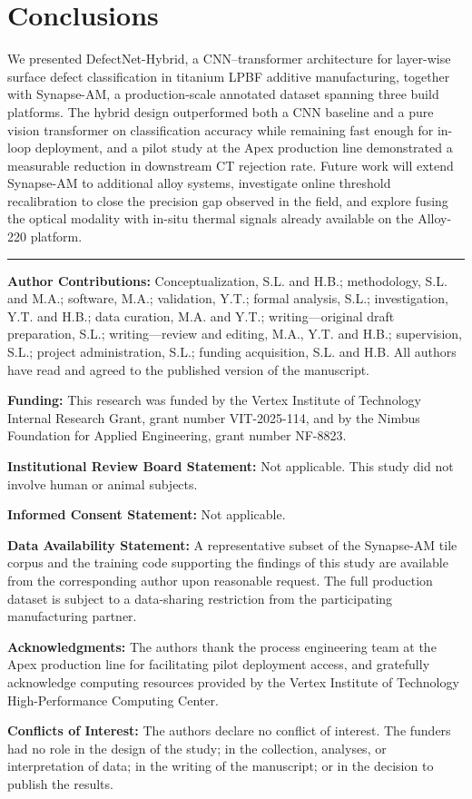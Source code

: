 \section{Conclusions}
We presented DefectNet-Hybrid, a CNN--transformer architecture for layer-wise surface defect classification in titanium LPBF additive manufacturing, together with Synapse-AM, a production-scale annotated dataset spanning three build platforms. The hybrid design outperformed both a CNN baseline and a pure vision transformer on classification accuracy while remaining fast enough for in-loop deployment, and a pilot study at the Apex production line demonstrated a measurable reduction in downstream CT rejection rate. Future work will extend Synapse-AM to additional alloy systems, investigate online threshold recalibration to close the precision gap observed in the field, and explore fusing the optical modality with in-situ thermal signals already available on the Alloy-220 platform.

\vspace{4pt}
\noindent\rule{\linewidth}{0.4pt}

{\small
\noindent\textbf{Author Contributions:} Conceptualization, S.L. and H.B.; methodology, S.L. and M.A.; software, M.A.; validation, Y.T.; formal analysis, S.L.; investigation, Y.T. and H.B.; data curation, M.A. and Y.T.; writing---original draft preparation, S.L.; writing---review and editing, M.A., Y.T. and H.B.; supervision, S.L.; project administration, S.L.; funding acquisition, S.L. and H.B. All authors have read and agreed to the published version of the manuscript.

\noindent\textbf{Funding:} This research was funded by the Vertex Institute of Technology Internal Research Grant, grant number VIT-2025-114, and by the Nimbus Foundation for Applied Engineering, grant number NF-8823.

\noindent\textbf{Institutional Review Board Statement:} Not applicable. This study did not involve human or animal subjects.

\noindent\textbf{Informed Consent Statement:} Not applicable.

\noindent\textbf{Data Availability Statement:} A representative subset of the Synapse-AM tile corpus and the training code supporting the findings of this study are available from the corresponding author upon reasonable request. The full production dataset is subject to a data-sharing restriction from the participating manufacturing partner.

\noindent\textbf{Acknowledgments:} The authors thank the process engineering team at the Apex production line for facilitating pilot deployment access, and gratefully acknowledge computing resources provided by the Vertex Institute of Technology High-Performance Computing Center.

\noindent\textbf{Conflicts of Interest:} The authors declare no conflict of interest. The funders had no role in the design of the study; in the collection, analyses, or interpretation of data; in the writing of the manuscript; or in the decision to publish the results.
}

